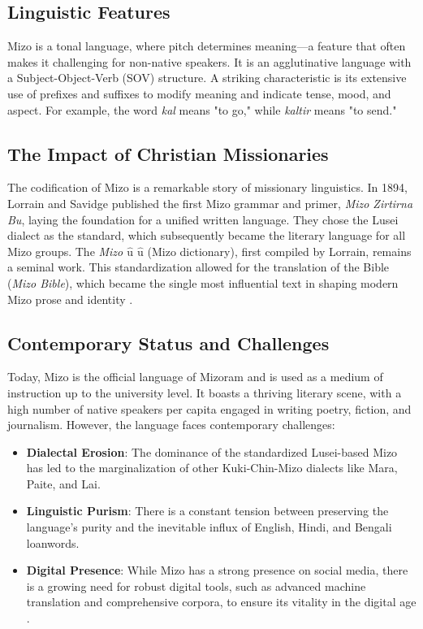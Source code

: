 \documentclass[12pt]{article}
\begin{document}
\subsection{Linguistic Features}
Mizo is a tonal language, where pitch determines meaning—a feature that often makes it challenging for non-native speakers. It is an agglutinative language with a Subject-Object-Verb (SOV) structure. A striking characteristic is its extensive use of prefixes and suffixes to modify meaning and indicate tense, mood, and aspect. For example, the word \textit{kal} means "to go," while \textit{kaltir} means "to send."

\subsection{The Impact of Christian Missionaries}
The codification of Mizo is a remarkable story of missionary linguistics. In 1894, Lorrain and Savidge published the first Mizo grammar and primer, \textit{Mizo Zirtirna Bu}, laying the foundation for a unified written language. They chose the Lusei dialect as the standard, which subsequently became the literary language for all Mizo groups. The \textit{Mizo $\hat{\text{u}}$ $\hat{\text{u}}$} (Mizo dictionary), first compiled by Lorrain, remains a seminal work. This standardization allowed for the translation of the Bible (\textit{Mizo Bible}), which became the single most influential text in shaping modern Mizo prose and identity \cite{lorrain1940dictionary}.

\subsection{Contemporary Status and Challenges}
Today, Mizo is the official language of Mizoram and is used as a medium of instruction up to the university level. It boasts a thriving literary scene, with a high number of native speakers per capita engaged in writing poetry, fiction, and journalism. However, the language faces contemporary challenges:
\begin{itemize}
    \item \textbf{Dialectal Erosion}: The dominance of the standardized Lusei-based Mizo has led to the marginalization of other Kuki-Chin-Mizo dialects like Mara, Paite, and Lai.
    \item \textbf{Linguistic Purism}: There is a constant tension between preserving the language's purity and the inevitable influx of English, Hindi, and Bengali loanwords.
    \item \textbf{Digital Presence}: While Mizo has a strong presence on social media, there is a growing need for robust digital tools, such as advanced machine translation and comprehensive corpora, to ensure its vitality in the digital age \cite{chhangte2008mizo}.
\end{itemize}
\end{document}
